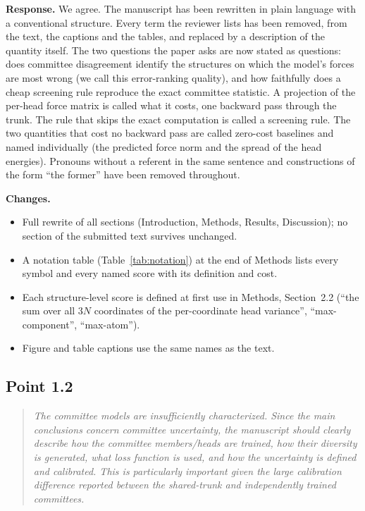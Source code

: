 \documentclass[11pt]{article}
\newcommand{\rpoint}[1]{\begin{quote}\itshape #1\end{quote}}
\newcommand{\response}{\medskip\noindent\textbf{Response.} }
\newcommand{\changes}{\medskip\noindent\textbf{Changes.}}
\begin{document}
\response
We agree. The manuscript has been rewritten in plain language with a
conventional structure. Every term the reviewer lists has been removed, from
the text, the captions and the tables, and replaced by a description of the
quantity itself. The two questions the paper asks are now stated as questions:
does committee disagreement identify the structures on which the model's
forces are most wrong (we call this error-ranking quality), and how faithfully
does a cheap screening rule reproduce the exact committee statistic. A
projection of the per-head force matrix is called what it costs, one backward
pass through the trunk. The rule that skips the exact computation is called a
screening rule. The two quantities that cost no backward pass are called
zero-cost baselines and named individually (the predicted force norm and the
spread of the head energies). Pronouns without a referent in the same sentence
and constructions of the form ``the former'' have been removed throughout.

\changes
\begin{itemize}
\item Full rewrite of all sections (Introduction, Methods, Results,
  Discussion); no section of the submitted text survives unchanged.
\item A notation table (Table~\ref{tab:notation}) at the end of Methods lists
  every symbol and every named score with its definition and cost.
\item Each structure-level score is defined at first use in Methods,
  Section~2.2 (``the sum over all $3N$ coordinates of the per-coordinate head
  variance'', ``max-component'', ``max-atom'').
\item Figure and table captions use the same names as the text.
\end{itemize}

\subsection*{Point 1.2}
\rpoint{The committee models are insufficiently characterized. Since the main
conclusions concern committee uncertainty, the manuscript should clearly
describe how the committee members/heads are trained, how their diversity is
generated, what loss function is used, and how the uncertainty is defined and
calibrated. This is particularly important given the large calibration
difference reported between the shared-trunk and independently trained
committees.}
\end{document}
